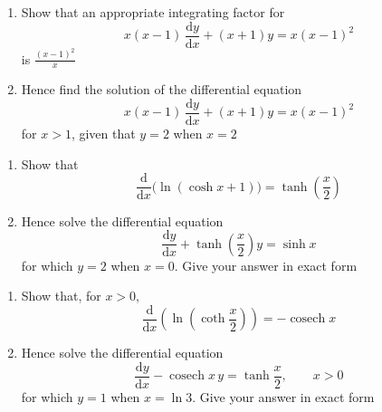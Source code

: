 \documentclass[leqno]{article}
\begin{document}
\begin{enumerate}[
  label=\textbf{\arabic*.},
  leftmargin=*,
  topsep=0pt,
  partopsep=0pt,
  parsep=0pt
]
\newpage

\questionitem

\begin{enumerate}[label=\textbf{(\alph*)}]
  \item Show that an appropriate integrating factor for
  \[
  x(x-1)\,\frac{\mathrm{d}y}{\mathrm{d}x}+(x+1)y=x(x-1)^2
  \]
  is $\frac{(x-1)^2}{x}$  \\
  \item Hence find the solution of the differential equation
  \[
  x(x-1)\,\frac{\mathrm{d}y}{\mathrm{d}x}+(x+1)y=x(x-1)^2
  \]
  for $x>1$, given that $y=2$ when $x=2$  \\
\end{enumerate}

\newpage

\questionitem

\begin{enumerate}[label=\textbf{(\alph*)}]
  \item Show that
  \[
  \frac{\mathrm{d}}{\mathrm{d}x}\bigl(\ln(\cosh x+1)\bigr)=\tanh\!\left(\frac{x}{2}\right)
  \]
  \item Hence solve the differential equation
  \[
  \frac{\mathrm{d}y}{\mathrm{d}x}+\tanh\!\left(\frac{x}{2}\right)y=\sinh x
  \]
  for which $y=2$ when $x=0$. Give your answer in exact form  \\
\end{enumerate}

\newpage

\questionitem

\begin{enumerate}[label=\textbf{(\alph*)}]
  \item Show that, for $x>0$,
  \[
  \frac{\mathrm{d}}{\mathrm{d}x}\!\left(\ln\!\left(\coth \frac{x}{2}\right)\right)=-\operatorname{cosech} x
  \]
  \item Hence solve the differential equation
  \[
  \frac{\mathrm{d}y}{\mathrm{d}x}-\operatorname{cosech} x\,y=\tanh \frac{x}{2},\qquad x>0
  \]
  for which $y=1$ when $x=\ln 3$. Give your answer in exact form  \\
\end{enumerate}

\newpage


\end{enumerate}
\end{document}
